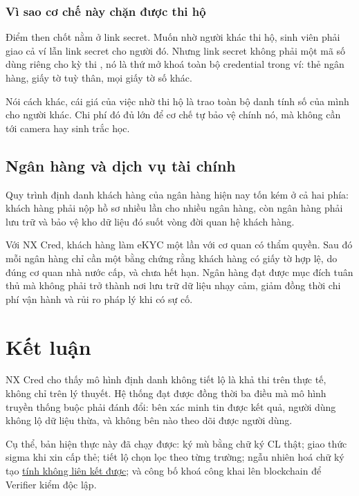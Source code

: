 \documentclass[a4paper,11pt,oneside]{report}
\theoremstyle{definition}
\theoremstyle{plain}
\newcommand{\g}[2]{\hyperref[term:#1]{#2}}
\begin{document}
\subsection{Vì sao cơ chế này chặn được thi hộ}

Điểm then chốt nằm ở link secret. Muốn nhờ người khác thi hộ, sinh viên phải giao
cả ví lẫn link secret cho người đó. Nhưng link secret không phải một mã số dùng riêng cho kỳ thi
,  nó là thứ mở khoá toàn bộ credential trong ví: thẻ ngân hàng, giấy tờ tuỳ
thân, mọi giấy tờ số khác.

Nói cách khác, cái giá của việc nhờ thi hộ là trao toàn bộ danh tính số của mình cho người khác.
Chi phí đó đủ lớn để cơ chế tự bảo vệ chính nó, mà không cần tới camera hay sinh trắc học.

\section{Ngân hàng và dịch vụ tài chính}

Quy trình định danh khách hàng của ngân hàng hiện nay tốn kém ở cả hai phía: khách hàng phải nộp
hồ sơ nhiều lần cho nhiều ngân hàng, còn ngân hàng phải lưu trữ và bảo vệ kho dữ liệu đó suốt
vòng đời quan hệ khách hàng.

Với NX Cred, khách hàng làm eKYC một lần với cơ quan có thẩm quyền. Sau đó mỗi ngân
hàng chỉ cần một bằng chứng rằng khách hàng có giấy tờ hợp lệ, do đúng cơ quan nhà nước
cấp, và chưa hết hạn. Ngân hàng đạt được mục đích tuân thủ mà không phải trở thành nơi lưu trữ dữ
liệu nhạy cảm, giảm đồng thời chi phí vận hành và rủi ro pháp lý khi có sự cố.

\chapter{Kết luận}

NX Cred cho thấy mô hình định danh không tiết lộ là khả thi trên thực tế, không chỉ trên lý
thuyết. Hệ thống đạt được đồng thời ba điều mà mô hình truyền thống buộc phải đánh đổi: bên xác
minh tin được kết quả, người dùng không lộ dữ liệu thừa, và không bên nào theo dõi được người
dùng.

Cụ thể, bản hiện thực này đã chạy được: ký mù bằng chữ ký CL thật;
giao thức sigma khi xin cấp thẻ; tiết lộ chọn lọc theo từng trường;
ngẫu nhiên hoá chữ ký tạo \g{unlink}{tính không liên kết được}; và công bố
khoá công khai lên blockchain để Verifier kiểm độc lập.
\end{document}
